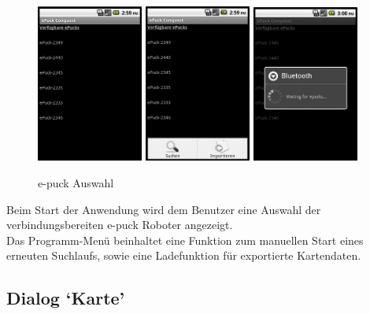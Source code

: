 \documentclass[10pt,a4paper]{article}
\begin{document}
			\begin{figure}[h]
				  \centering
				\includegraphics[width=3.5cm]{images/start.png}
				\includegraphics[width=3.5cm]{images/start_menu.png}
				\includegraphics[width=3.5cm]{images/start_btsuche.png}
  				\caption{e-puck Auswahl}
  			\end{figure}	  				
  			
  				Beim Start der Anwendung wird dem Benutzer eine Auswahl der verbindungsbereiten e-puck Roboter angezeigt.  \\
  				Das Programm-Menü beinhaltet eine Funktion zum manuellen Start eines erneuten Suchlaufs, sowie eine Ladefunktion
  				für exportierte Kartendaten.
			
			\subsection{Dialog `Karte'}
\end{document}

